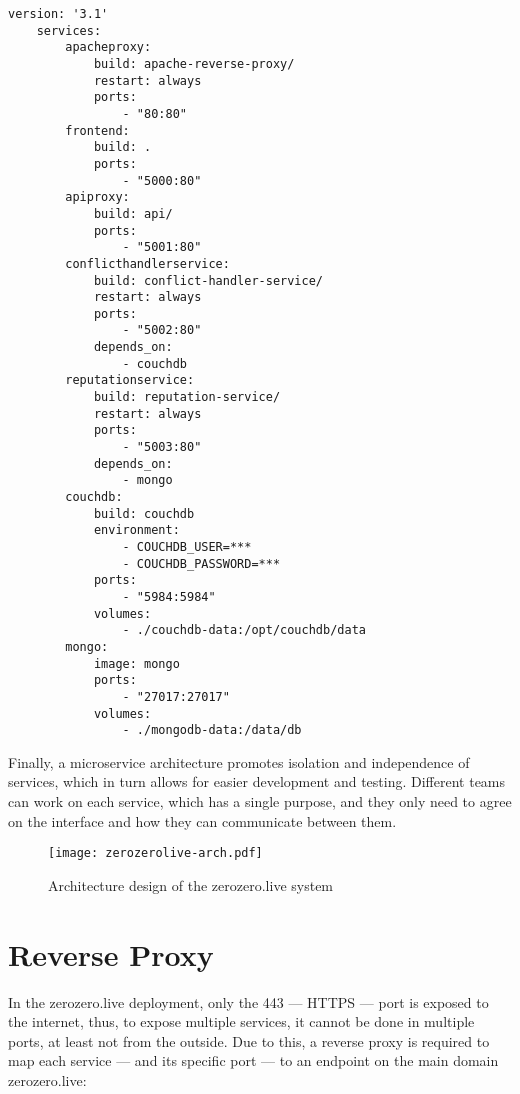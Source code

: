 \lstset{float=H}

\begin{lstlisting}[label={lst:docker-compose-definition},caption={docker-compose.yml file --- Docker services definition}]
    version: '3.1'
    services:
        apacheproxy:
            build: apache-reverse-proxy/
            restart: always
            ports: 
                - "80:80"
        frontend: 
            build: .
            ports: 
                - "5000:80"
        apiproxy: 
            build: api/
            ports: 
                - "5001:80"
        conflicthandlerservice:
            build: conflict-handler-service/
            restart: always
            ports:
                - "5002:80"
            depends_on: 
                - couchdb
        reputationservice:
            build: reputation-service/
            restart: always
            ports:
                - "5003:80"
            depends_on: 
                - mongo
        couchdb:
            build: couchdb
            environment:
                - COUCHDB_USER=***
                - COUCHDB_PASSWORD=***
            ports:
                - "5984:5984"
            volumes: 
                - ./couchdb-data:/opt/couchdb/data
        mongo:
            image: mongo
            ports:
                - "27017:27017"
            volumes: 
                - ./mongodb-data:/data/db
\end{lstlisting}


Finally, a microservice architecture promotes isolation and independence of services, which in turn allows for easier development and testing. Different teams can work on each service, which has a single purpose, and they only need to agree on the interface and how they can communicate between them.


\begin{figure}[h]
    \begin{center}
        \leavevmode
        \texttt{[image: zerozerolive-arch.pdf]}
        \caption{Architecture design of the zerozero.live system}
        \label{fig:services-arch}
    \end{center}
\end{figure}

\section{Reverse Proxy}

In the zerozero.live deployment, only the 443 --- HTTPS --- port is exposed to the internet, thus, to expose multiple services, it cannot be done in multiple ports, at least not from the outside. Due to this, a reverse proxy is required to map each service --- and its specific port --- to an endpoint on the main domain zerozero.live:
 
